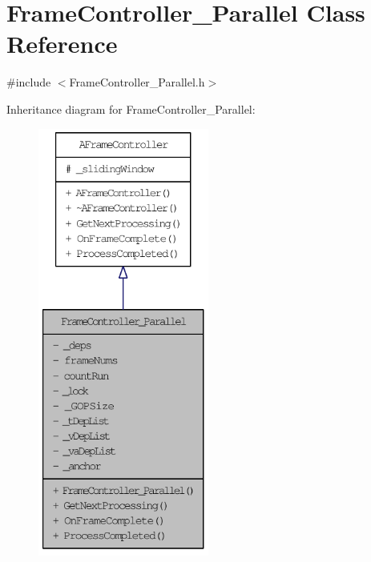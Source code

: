 \hypertarget{class_frame_controller___parallel}{
\section{FrameController\_\-Parallel Class Reference}
\label{class_frame_controller___parallel}
}


{\ttfamily \#include $<$FrameController\_\-Parallel.h$>$}



Inheritance diagram for FrameController\_\-Parallel:\nopagebreak
\begin{figure}[H]
\begin{center}
\leavevmode
\includegraphics[height=400pt]{class_frame_controller___parallel__inherit__graph}
\end{center}
\end{figure}



